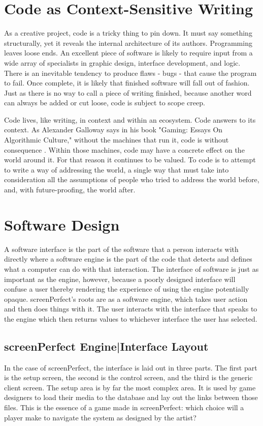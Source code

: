 \section{Code as Context-Sensitive Writing}
As a creative project, code is a tricky thing to pin down. It must say something structurally, yet it reveals the internal architecture of its authors. Programming leaves loose ends. An excellent piece of software is likely to require input from a wide array of specialists in graphic design, interface development, and logic. There is an inevitable tendency to produce flaws - bugs - that cause the program to fail. Once complete, it is likely that finished software will fall out of fashion. Just as there is no way to call a piece of writing finished, because another word can always be added or cut loose, code is subject to scope creep. 

Code lives, like writing, in context and within an ecosystem. Code answers to its context. As Alexander Galloway says in his book "Gaming: Essays On Algorithmic Culture," without the machines that run it, code is without consequence \cite{galloway}. Within those machines, code may have a concrete effect on the world around it. For that reason it continues to be valued. To code is to attempt to write a way of addressing the world, a single way that must take into consideration all the assumptions of people who tried to address the world before, and, with future-proofing, the world after. 

\section{Software Design}
A software interface is the part of the software that a person interacts with directly where a software engine is the part of the code that detects and defines what a computer can do with that interaction. 
The interface of software is just as important as the engine, however, because a poorly designed interface will confuse a user thereby rendering the experience of using the engine potentially opaque. 
screenPerfect's roots are as a software engine, which takes user action and then does things with it. The user interacts with the interface that speaks to the engine which then returns values to whichever interface the user has selected.

\subsection{screenPerfect Engine|Interface Layout}
In the case of screenPerfect, the interface is laid out in three parts. The first part is the setup screen, the second is the control screen, and the third is the generic client screen. The setup area is by far the most complex area. It is used by game designers to load their media to the database and lay out the links between those files. This is the essence of a game made in screenPerfect: which choice will a player make to navigate the system as designed by the artist?

